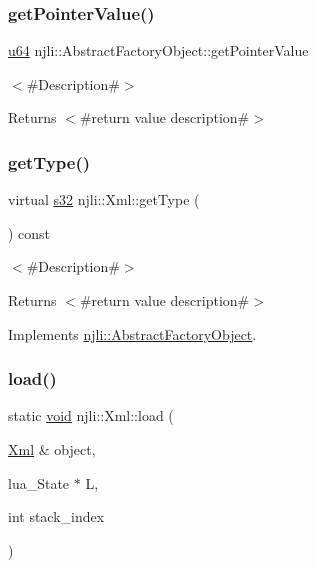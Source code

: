 \subsubsection{\texorpdfstring{get\+Pointer\+Value()}{getPointerValue()}}
{\footnotesize\ttfamily \mbox{\hyperlink{_util_8h_ad758b7a5c3f18ed79d2fcd23d9f16357}{u64}} njli\+::\+Abstract\+Factory\+Object\+::get\+Pointer\+Value}

$<$\#\+Description\#$>$

\begin{DoxyReturn}{Returns}
$<$\#return value description\#$>$ 
\end{DoxyReturn}
\mbox{\label{classnjli_1_1_xml_a45d39d1ce5352ecd046a4bc2ab44895c}} 
\subsubsection{\texorpdfstring{get\+Type()}{getType()}}
{\footnotesize\ttfamily virtual \mbox{\hyperlink{_util_8h_aa62c75d314a0d1f37f79c4b73b2292e2}{s32}} njli\+::\+Xml\+::get\+Type (\begin{DoxyParamCaption}{ }\end{DoxyParamCaption}) const\hspace{0.3cm}{\ttfamily [virtual]}}

$<$\#\+Description\#$>$

\begin{DoxyReturn}{Returns}
$<$\#return value description\#$>$ 
\end{DoxyReturn}


Implements \mbox{\hyperlink{classnjli_1_1_abstract_factory_object_a207c86146d40d0794708ae7f2d4e60a7}{njli\+::\+Abstract\+Factory\+Object}}.

\mbox{\label{classnjli_1_1_xml_abb4d1b9b986a184ce29d4d9a00269f27}} 
\subsubsection{\texorpdfstring{load()}{load()}}
{\footnotesize\ttfamily static \mbox{\hyperlink{_thread_8h_af1e856da2e658414cb2456cb6f7ebc66}{void}} njli\+::\+Xml\+::load (\begin{DoxyParamCaption}\item[{\mbox{\hyperlink{classnjli_1_1_xml}{Xml}} \&}]{object,  }\item[{lua\+\_\+\+State $\ast$}]{L,  }\item[{int}]{stack\+\_\+index }\end{DoxyParamCaption})\hspace{0.3cm}{\ttfamily [static]}}

